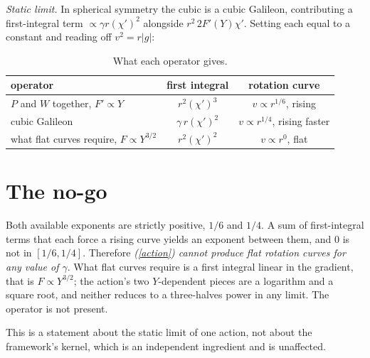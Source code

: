 \documentclass[11pt,letterpaper]{article}
\begin{document}
\emph{Static limit.} In spherical symmetry the cubic is a cubic Galileon, contributing a first-integral term $\propto\gamma r(\chi')^2$ alongside $r^2\,2F'(Y)\chi'$. Setting each equal to a constant and reading off $v^2=r|g|$:
\begin{table}[h]\centering\caption{What each operator gives.}\label{tab}
\begin{tabular}{lcc}\toprule
operator & first integral & rotation curve\\\midrule
$P$ and $W$ together, $F'\propto Y$ & $r^2(\chi')^3$ & $v\propto r^{1/6}$, rising\\
cubic Galileon & $\gamma\,r(\chi')^2$ & $v\propto r^{1/4}$, rising faster\\
what flat curves require, $F\propto Y^{3/2}$ & $r^2(\chi')^2$ & $v\propto r^{0}$, flat\\\bottomrule
\end{tabular}\end{table}

\section{The no-go}
Both available exponents are strictly positive, $1/6$ and $1/4$. A sum of first-integral terms that each force a rising curve yields an exponent between them, and $0$ is not in $[1/6,1/4]$. Therefore \emph{(\ref{action}) cannot produce flat rotation curves for any value of $\gamma$}. What flat curves require is a first integral linear in the gradient, that is $F\propto Y^{3/2}$; the action's two $Y$-dependent pieces are a logarithm and a square root, and neither reduces to a three-halves power in any limit. The operator is not present.

This is a statement about the static limit of one action, not about the framework's kernel, which is an independent ingredient and is unaffected.
\end{document}
